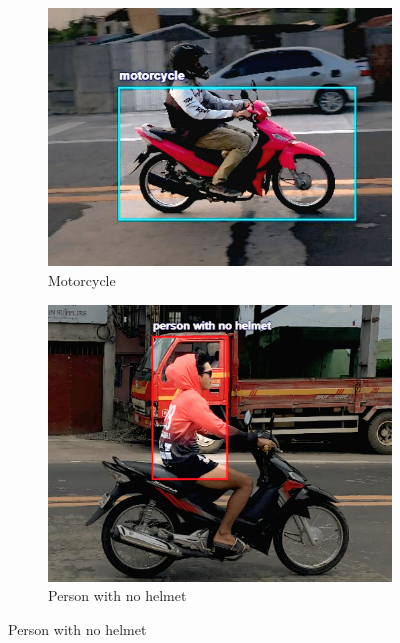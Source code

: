\begin{refsection}
\begin{figure}[H]
    \begin{subfigure}{0.30\textwidth}
        \centering
        \includegraphics[width=0.9\linewidth]{figures/Fig 4a.jpg}
        \caption{Motorcycle}
        \label{fig:4a}
    \end{subfigure}%
    \hfill
    \begin{subfigure}{0.30\textwidth}
        \centering
        \includegraphics[width=0.9\linewidth]{figures/Fig 4b.jpg}
        \caption{Person with no helmet}
        \label{fig:4b}
    \end{subfigure}


\end{figure}
\end{refsection}
